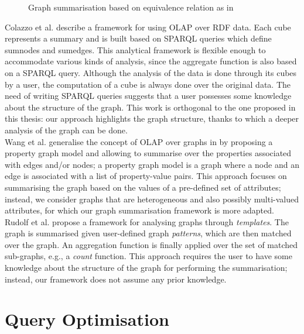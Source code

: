 \begin{figure}
	\centering
	\resizebox{.5\textwidth}{!}{
		
	}
	\caption{Graph summarisation based on equivalence relation as in \cite{zhao:sigmod:2011}}
	\label{fig:graph-cube}
\end{figure}

Colazzo et al. \cite{colazzo:www:2014} describe a framework for using OLAP over RDF data. Each cube represents a summary and is built based on SPARQL queries which define sumnodes and sumedges. This analytical framework is flexible enough to accommodate various kinds of analysis, since the aggregate function is also based on a SPARQL query. Although the analysis of the data is done through its cubes by a user, the computation of a cube is always done over the original data. The need of writing SPARQL queries suggests that a user possesses some knowledge about the structure of the graph. This work is orthogonal to the one proposed in this thesis: our approach highlights the graph structure, thanks to which a deeper analysis of the graph can be done.\\

Wang et al. generalise the concept of OLAP over graphs in \cite{zhengkui:2014:ppg} by proposing a property graph model and allowing to summarise over the properties associated with edges and/or nodes; a property graph model is a graph where a node and an edge is associated with a list of property-value pairs. This approach focuses on summarising the graph based on the values of a pre-defined set of attributes; instead, we consider graphs that are heterogeneous and also possibly multi-valued attributes, for which our graph summarisation framework is more adapted.\\

Rudolf et al. \cite{rudolf:2013:slg} propose a framework for analysing graphs through \emph{templates}. The graph is summarised given user-defined graph \emph{patterns}, which are then matched over the graph. An aggregation function is finally applied over the set of matched sub-graphs, e.g., a \emph{count} function. This approach requires the user to have some knowledge about the structure of the graph for performing the summarisation; instead, our framework does not assume any prior knowledge.

\section{Query Optimisation}
\label{chap03:review:query-optim}

